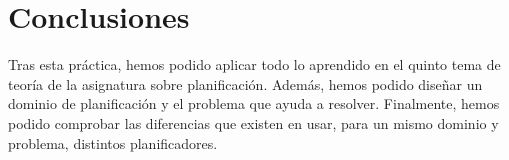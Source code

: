 \documentclass[a4paper]{article}
\begin{document}
\section{Conclusiones}
Tras esta práctica, hemos podido aplicar todo lo aprendido en el quinto tema de teoría de la asignatura sobre planificación. Además, hemos podido diseñar un dominio de planificación y el problema que ayuda a resolver. Finalmente, hemos podido comprobar las diferencias que existen en usar, para un mismo dominio y problema, distintos planificadores.
\end{document}
